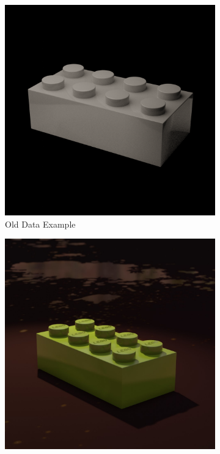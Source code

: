 \documentclass[]{article}
\begin{document}
\begin{figure}[h]
    \centering
    \begin{subfigure}[b]{0.2\textwidth}
        \centering
        \includegraphics[width=\textwidth]{single example/oldex.png}
        \caption{Old Data Example}
    \end{subfigure}
    \begin{subfigure}[b]{0.2\textwidth}
        \centering
        \includegraphics[width=\textwidth]{single example/newex.jpg}

\end{subfigure}
\end{figure}
\end{document}
